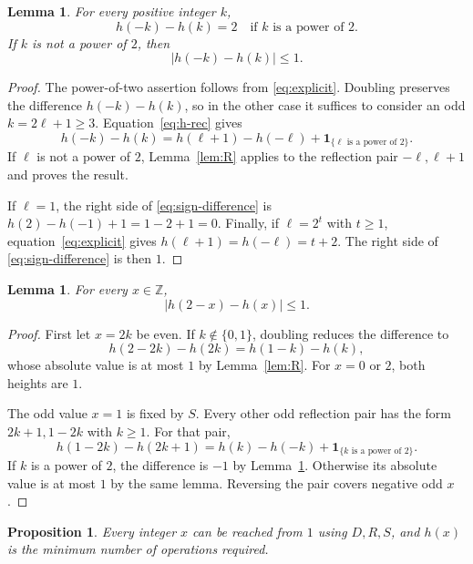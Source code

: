 \documentclass[11pt]{article}
\newtheorem{lemma}[theorem]{Lemma}
\newtheorem{proposition}[theorem]{Proposition}
\theoremstyle{remark}
\newcommand{\Z}{\mathbb Z}
\newcommand{\ind}{\mathbf 1}
\begin{document}
\begin{lemma}\label{lem:sign}
For every positive integer $k$,
\[
h(-k)-h(k)=2\quad\text{if }k\text{ is a power of }2.
\]
If $k$ is not a power of $2$, then
\[
|h(-k)-h(k)|\le1.
\]
\end{lemma}

\begin{proof}
The power-of-two assertion follows from \eqref{eq:explicit}.
Doubling preserves the difference $h(-k)-h(k)$, so in the other case
it suffices to consider an odd $k=2\ell+1\ge3$. Equation~\eqref{eq:h-rec}
gives
\begin{equation}\label{eq:sign-difference}
h(-k)-h(k)
=h(\ell+1)-h(-\ell)+\ind_{\{\ell\text{ is a power of }2\}}.
\end{equation}
If $\ell$ is not a power of $2$, Lemma~\ref{lem:R} applies to the
reflection pair $-\ell,\ell+1$ and proves the result.

If $\ell=1$, the right side of \eqref{eq:sign-difference} is
$h(2)-h(-1)+1=1-2+1=0$. Finally, if $\ell=2^t$ with $t\ge1$,
equation~\eqref{eq:explicit} gives
$h(\ell+1)=h(-\ell)=t+2$. The right side of
\eqref{eq:sign-difference} is then $1$.
\end{proof}

\begin{lemma}\label{lem:S}
For every $x\in\Z$,
\[
|h(2-x)-h(x)|\le1.
\]
\end{lemma}

\begin{proof}
First let $x=2k$ be even. If $k\notin\{0,1\}$, doubling reduces the
difference to
\[
h(2-2k)-h(2k)=h(1-k)-h(k),
\]
whose absolute value is at most $1$ by Lemma~\ref{lem:R}.
For $x=0$ or $2$, both heights are $1$.

The odd value $x=1$ is fixed by $S$. Every other odd reflection pair
has the form $2k+1,1-2k$ with $k\ge1$. For that pair,
\[
h(1-2k)-h(2k+1)
=h(k)-h(-k)+\ind_{\{k\text{ is a power of }2\}}.
\]
If $k$ is a power of $2$, the difference is $-1$ by
Lemma~\ref{lem:sign}. Otherwise its absolute value is at most $1$
by the same lemma. Reversing the pair covers negative odd $x$.
\end{proof}

\begin{proposition}\label{prop:distance}
Every integer $x$ can be reached from $1$ using $D,R,S$, and $h(x)$
is the minimum number of operations required.
\end{proposition}
\end{document}
